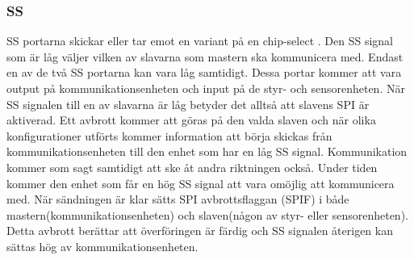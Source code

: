\subsubsection{SS}
SS portarna skickar eller tar emot en variant på en chip-select . Den SS signal som är låg väljer vilken av slavarna som mastern ska kommunicera med. Endast en av de två SS portarna kan vara låg samtidigt. Dessa portar kommer att vara output på kommunikationsenheten och input på de styr- och sensorenheten.
När SS signalen till en av slavarna är låg betyder det alltså att slavens SPI är aktiverad. Ett avbrott kommer att göras på den valda slaven och när olika konfigurationer utförts kommer information att börja skickas från kommunikationsenheten till den enhet som har en låg SS signal. Kommunikation kommer som sagt samtidigt att ske åt andra riktningen också. Under tiden kommer den enhet som får en hög SS signal att vara omöjlig att kommunicera med.
När sändningen är klar sätts SPI avbrottsflaggan (SPIF) i både mastern(kommunikationsenheten) och slaven(någon av styr- eller sensorenheten). Detta avbrott berättar att överföringen är färdig och SS signalen återigen kan sättas hög av kommunikationsenheten.





